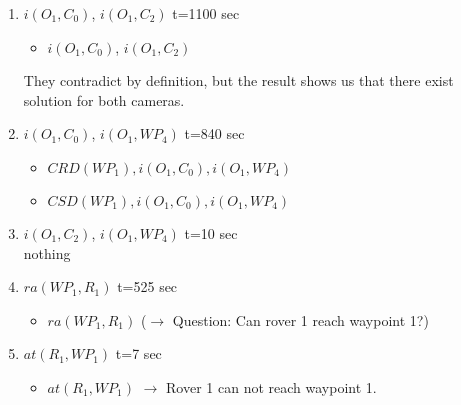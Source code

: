 	\begin{enumerate}
		\item $i(O_1, C_0)$, $i(O_1, C_2)$ t=1100 sec
		\begin{itemize}
			\item $i(O_1, C_0)$, $i(O_1, C_2)$
		\end{itemize}
			They contradict by definition, but the result shows us that there exist 
			solution for both cameras.
		\item $i(O_1, C_0)$, $i(O_1, WP_4)$ t=840 sec
		\begin{itemize}
			\item $CRD(WP_1), i(O_1, C_0), i(O_1, WP_4)$
			\item $CSD(WP_1), i(O_1, C_0), i(O_1, WP_4)$
		\end{itemize}
			
		\item $i(O_1, C_2)$, $i(O_1, WP_4)$ t=10 sec\\
			nothing
		\item $ra(WP_1, R_1)$ t=525 sec
			\begin{itemize}
				\item $ra(WP_1, R_1)$ ($\rightarrow$ Question: Can rover 1 reach waypoint 1?)
			\end{itemize}
		\item $at(R_1, WP_1)$ t=7 sec
			\begin{itemize}
				\item $at(R_1, WP_1)$ $\rightarrow$ Rover 1 can not reach waypoint 1.
			\end{itemize}
	\end{enumerate}



